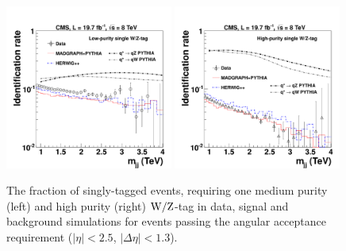 \begin{figure}[htb]
\begin{center}
\includegraphics[width=0.49\textwidth]{EXO-12-024/figs/signal-acc-eff/single-tagging-eff-medium.pdf}
\includegraphics[width=0.49\textwidth]{EXO-12-024/figs/signal-acc-eff/single-tagging-eff.pdf}
\end{center}
\caption{The fraction of singly-tagged events, requiring one medium purity (left) 
  and high purity (right) ${\rm W}/{\rm Z}$-tag in data,
  signal and background simulations for events passing the angular acceptance
  requirement ($|\eta| < 2.5$, $|\Delta\eta|<1.3$).}
\label{fig:singleefficiencies}
\end{figure}

